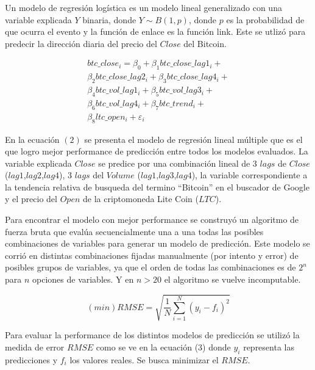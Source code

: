 \documentclass[a4paper,12pt,twocolumn]{article}
\begin{document}
Un modelo de regresión logística es un modelo lineal generalizado con una variable explicada $Y$ binaria, donde $Y \sim B(1,p)$, donde $p$ es la probabilidad de que ocurra el evento y la función de enlace es la función link. Este se utlizó para predecir la dirección diaria del precio del $Close$ del Bitcoin. 

\begin{equation}
\begin{split}
btc\_close_i  =     \beta_0 + \beta_1 btc\_close\_lag1_i    
+ \\ \beta_2 btc\_close\_lag2_i +   \beta_3 btc\_close\_lag4_i + \\ 
\beta_4 btc\_vol\_lag1_i  +  \beta_5 btc\_vol\_lag3_i + \\ \beta_6  btc\_vol\_lag4_i  +  \beta_7 btc\_trend_i + \\ \beta_8 ltc\_open_i + \varepsilon_i
\end{split}
\label{eq:modelo}
\end{equation}

En la ecuación $(2)$ se presenta el modelo de regresión lineal múltiple que es el que logro mejor performance de predicción entre todos los modelos evaluados. La variable explicada $Close$ se predice por una combinación lineal de 3 $lags$ de $Close$ ($lag1$,$lag2$,$lag4$), 3 $lags$ del $Volume$ ($lag1$,$lag3$,$lag4$), la variable correspondiente a la tendencia relativa de busqueda del termino “Bitcoin” en el buscador de Google y el precio del $Open$ de la criptomoneda Lite Coin ($LTC$).

Para encontrar el modelo con mejor performance se construyó un algoritmo de fuerza bruta que evalúa secuencialmente una a una todas las posibles combinaciones de variables para generar un modelo de predicción. Este modelo se corrió en distintas combinaciones fijadas manualmente (por intento y error) de posibles grupos de variables, ya que el orden de todas las combinaciones es de $2^n$ para $n$ opciones de variables. Y en $n>20$ el algoritmo se vuelve incomputable.

\begin{equation}
(min)RMSE=\sqrt{\frac{1}{N} \sum_{i=1}^{N}\left(y_{i}-f_{i}\right)^{2}}
\end{equation}

Para evaluar la performance de los distintos modelos de predicción se utilizó la medida de error $RMSE$ como se ve en la ecuación (3) donde $y_i$ representa las predicciones y $f_i$ los valores reales. Se busca minimizar el $RMSE$.
\end{document}
